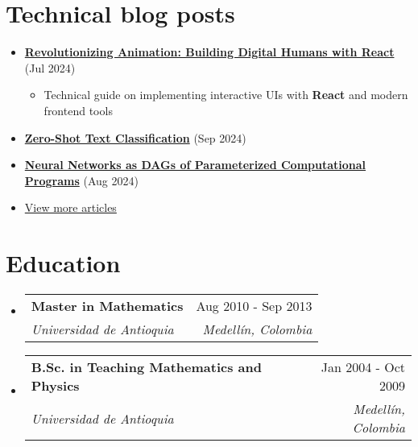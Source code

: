 \documentclass[letterpaper,11pt]{article}
\makeatletter
\newcommand{\resumeSubheading}[4]{
  \vspace{-2pt}
  \item[]
  \begin{tabular*}{\textwidth}{@{\extracolsep{\fill}}l r}
    \textbf{#1} & #2 \\
    \textit{#3} & \textit{#4} \\
  \end{tabular*}
  \vspace{-5pt}
}
\newcommand{\normalfaExternalLink}{{\mdseries\faExternalLink}}
\makeatother
\begin{document}
\section{Technical blog posts}
\begin{itemize}[leftmargin=*]    
    \item \textbf{\href{https://www.asanchezyali.com/blog/ai-avatars/20240703DigitalHuman}{Revolutionizing Animation: Building Digital Humans with React}} (Jul 2024)
    \begin{itemize}
        \item Technical guide on implementing interactive UIs with \textbf{React} and modern frontend tools
    \end{itemize}
    \item \textbf{\href{https://www.asanchezyali.com/blog/ai/20240917ZeroShot}{Zero-Shot Text Classification}} (Sep 2024)
    \item \textbf{\href{https://www.asanchezyali.com/blog/differentiable-programming/20240923DifferentiablePrograms}{Neural Networks as DAGs of Parameterized Computational Programs}} (Aug 2024)
    \item   \href{https://www.asanchezyali.com/}{View more articles \normalfaExternalLink}
\end{itemize}

\section{Education}
\begin{itemize}[leftmargin=0pt, itemindent=0pt, label={}]
\resumeSubheading
{Master in Mathematics}{Aug 2010 - Sep 2013}
{Universidad de Antioquia}{Medellín, Colombia}

\resumeSubheading
{B.Sc. in Teaching Mathematics and Physics}{Jan 2004 - Oct 2009}
{Universidad de Antioquia}{Medellín, Colombia}
\end{itemize}
\end{document}
